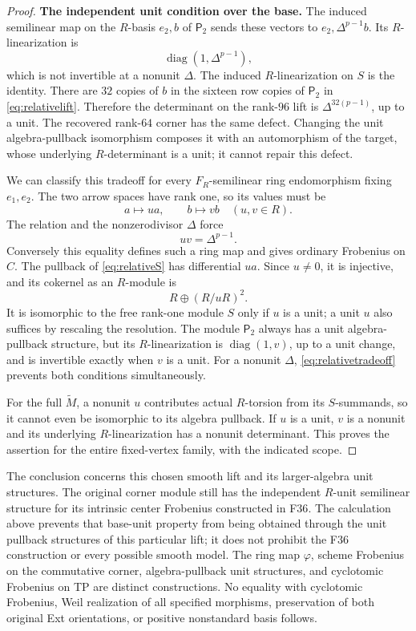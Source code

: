 \documentclass[11pt,a4paper]{article}
\newcommand{\fid}[1]{\textsf{#1}}\newcommand{\gate}[1]{\textsf{#1}}
\theoremstyle{named}\newtheorem{finding}{Finding}[section]
\theoremstyle{definition}\newtheorem{definition}[finding]{Definition}
\theoremstyle{remark}\newtheorem{remark}[finding]{Remark}
\begin{document}
\begin{proof}
\par\smallskip\noindent\textbf{The independent unit condition over the base.}\quad
The induced semilinear map on the $R$-basis $e_2,b$
of $\mathsf P_2$ sends these vectors to
$e_2,\Delta^{p-1}b$. Its $R$-linearization is
\begin{equation}\label{eq:relativebaseunit}
 \operatorname{diag}(1,\Delta^{p-1}),
\end{equation}
which is not invertible at a nonunit $\Delta$.
The induced $R$-linearization on $S$ is the identity.
There are $32$ copies of $b$ in the sixteen row copies
of $\mathsf P_2$ in \eqref{eq:relativelift}. Therefore
the determinant on the rank-$96$ lift is
$\Delta^{32(p-1)}$, up to a unit.
The recovered rank-$64$ corner has the same defect.
Changing the unit algebra-pullback isomorphism composes
it with an automorphism of the target, whose underlying
$R$-determinant is a unit; it cannot repair this defect.

We can classify this tradeoff for every
$F_R$-semilinear ring endomorphism fixing $e_1,e_2$.
The two arrow spaces have rank one, so its values must be
\[
 a\longmapsto ua,\qquad b\longmapsto vb
       \quad(u,v\in R).
\]
The relation and the nonzerodivisor $\Delta$ force
\begin{equation}\label{eq:relativetradeoff}
 uv=\Delta^{p-1}.
\end{equation}
Conversely this equality defines such a ring map and
gives ordinary Frobenius on $C$.
The pullback of \eqref{eq:relativeS} has differential
$ua$. Since $u\ne0$, it is injective, and its cokernel
as an $R$-module is
\[
 R\oplus(R/uR)^2.
\]
It is isomorphic to the free rank-one module $S$ only
if $u$ is a unit; a unit $u$ also suffices by rescaling
the resolution. The module $\mathsf P_2$ always has a
unit algebra-pullback structure, but its $R$-linearization
is $\operatorname{diag}(1,v)$, up to a unit change,
and is invertible exactly when $v$ is a unit.
For a nonunit $\Delta$, \eqref{eq:relativetradeoff}
prevents both conditions simultaneously.

For the full $\widetilde M$, a nonunit $u$ contributes
actual $R$-torsion from its $S$-summands, so it cannot
even be isomorphic to its algebra pullback. If $u$ is
a unit, $v$ is a nonunit and its underlying
$R$-linearization has a nonunit determinant. This
proves the assertion for the entire fixed-vertex
family, with the indicated scope.
\end{proof}

The conclusion concerns this chosen smooth lift and its
larger-algebra unit structures. The original corner module
still has the independent $R$-unit semilinear structure for
its intrinsic center Frobenius constructed in \fid{F36}.
The calculation above prevents that base-unit property
from being obtained through the unit pullback structures
of this particular lift; it does not prohibit the
\fid{F36} construction or every possible smooth model.
The ring map $\varphi$, scheme Frobenius on the commutative
corner, algebra-pullback unit structures, and cyclotomic
Frobenius on TP are distinct constructions. No equality
with cyclotomic Frobenius, Weil realization of all
specified morphisms, preservation of both original Ext
orientations, or positive nonstandard basis follows.
\end{document}
